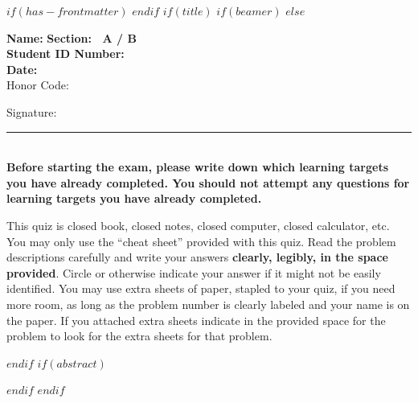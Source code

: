 $if(has-frontmatter)$
\frontmatter
$endif$
$if(title)$
$if(beamer)$
\frame{\titlepage}
$else$
\maketitle

\newcommand{\littleblank}{\rule{.5in}{.01in}~~}
\newcommand{\bigblank}{\rule{2.5in}{.01in}~~}
\renewcommand{\setminus}{\backslash}


\raggedbottom

\vspace{-.6in}

\textbf{Name:} \underline{\hspace*{3in}} 
\hfill
\textbf{Section:~ A / B} ~ ~ ~ \\[2mm]

\textbf{Student ID Number:} \underline{\hspace*{3in}} \\[2mm]

\textbf{Date:} \underline{\hspace*{1.5in}} \\ 

{\Large{Honor Code:}}
\vspace{.6in}

Signature: \bigblank\\

\textbf{Before starting the exam, please write down which learning targets you have already completed. You should not attempt any questions for learning targets you have already completed.}


This quiz is closed book, closed notes, closed computer, closed calculator,
etc. 
You may only use the ``cheat sheet'' provided with this quiz. 
Read the problem descriptions carefully and write your answers \textbf{clearly, legibly, in the space provided}. 
Circle or otherwise indicate your answer if it might not be easily identified. 
You may use extra sheets of paper, stapled to your quiz, if you need more room, as long as the problem number is clearly labeled and your name is on the paper. 
If you attached extra sheets indicate in the provided space for the problem to look for the extra sheets for that problem.

\pagebreak

$endif$
$if(abstract)$
\begin{abstract}
$abstract$
\end{abstract}
$endif$
$endif$

